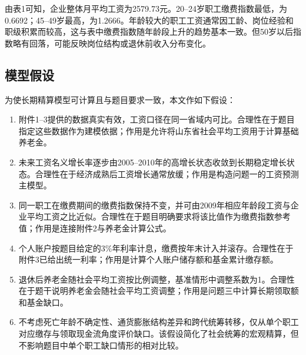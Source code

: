 \documentclass[UTF8,12pt,a4paper]{ctexart}
\begin{document}
由表1可知，企业整体月平均工资为2579.73元。20--24岁职工缴费指数最低，为0.6692；45--49岁最高，为1.2666。年龄较大的职工工资通常因工龄、岗位经验和职级积累而较高，这与表中缴费指数随年龄段上升的趋势基本一致。但50岁以后指数略有回落，可能反映岗位结构或退休前收入分布变化。

\subsection{模型假设}
为使长期精算模型可计算且与题目要求一致，本文作如下假设：
\begin{enumerate}[label=\textbf{假设\arabic*：}]
\item 附件1--3提供的数据真实有效，工资口径在同一省域内可比。合理性在于题目指定这些数据作为建模依据；作用是允许将山东省社会平均工资用于计算基础养老金。
\item 未来工资名义增长率逐步由2005--2010年的高增长状态收敛到长期稳定增长状态。合理性在于经济成熟后工资增长通常放缓；作用是构造问题一的工资预测主模型。
\item 同一职工在缴费期间的缴费指数保持不变，并可由2009年相应年龄段工资与企业平均工资之比近似。合理性在于题目明确要求将该比值作为缴费指数参考值；作用是连接附件2与养老金计算公式。
\item 个人账户按题目给定的3\%年利率计息，缴费按年末计入并滚存。合理性在于附件3已给出统一利率；作用是计算个人账户储存额和基金累计缴存额。
\item 退休后养老金随社会平均工资按比例调整，基准情形中调整系数为1。合理性在于题干说明养老金会随社会平均工资调整；作用是问题三中计算长期领取额和基金缺口。
\item 不考虑死亡年龄不确定性、通货膨胀结构差异和跨代统筹转移，仅从单个职工对应缴存与领取现金流角度评价缺口。该假设简化了社会统筹的宏观精算，但不影响题目中单个职工缺口情形的相对比较。
\end{enumerate}
\end{document}
